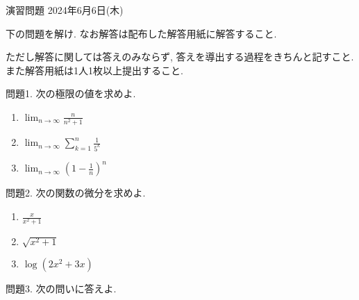 \documentclass[dvipdfmx,a4paper,11pt]{article}
\theoremstyle{definition}
\begin{document}
\pagestyle{empty}



\begin{center}
{\Large 演習問題 2024年6月6日(木)} \\

\end{center}


\begin{center}
 {\large 下の問題を解け. なお解答は配布した解答用紙に解答すること.}
  \end{center}
 ただし解答に関しては答えのみならず, 答えを導出する過程をきちんと記すこと. 
 また解答用紙は1人1枚以上提出すること.
  
  \vspace{11pt}
 問題1.  次の極限の値を求めよ.
 
 \begin{enumerate}
   \setlength{\parskip}{0cm} %
  \setlength{\itemsep}{0cm} %
 \item $\lim_{n \to \infty } \frac{n}{n^2 +1}$
 \item $\lim_{n \to \infty } \sum_{k=1}^{n} \frac{1}{5^k}$
 \item $\lim_{n \to \infty} \left(1 - \frac{1}{n}\right)^n$
 \end{enumerate}
 
\vspace{5pt}
 問題2. 次の関数の微分を求めよ.

\begin{enumerate}
   \setlength{\parskip}{0cm} %
  \setlength{\itemsep}{0cm} %
    \item $\frac{x}{x^2 +1}$ 
    
    \item $ \sqrt{x^2 + 1}$
    
    \item $  \log (2x^2 + 3x)$ 
\end{enumerate}
 
 \vspace{5pt}
 問題3. 次の問いに答えよ.
\end{document}
